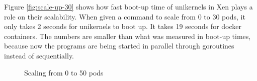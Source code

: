 Figure \ref{fig:scale-up-30} shows how fast boot-up time of unikernels in Xen plays a role on their scalability. When given a command to scale from 0 to 30 pods, it only takes 2 seconds for unikernels to boot up. It takes 19 seconds for docker containers. The numbers are smaller than what was measured in boot-up times, because now the programs are being started in parallel through goroutines instead of sequentially.


\begin{figure}[htpb]
  \centering
  \caption{Scaling from 0 to 50 pods}\label{fig:scale-up-50}
  \end{figure}

